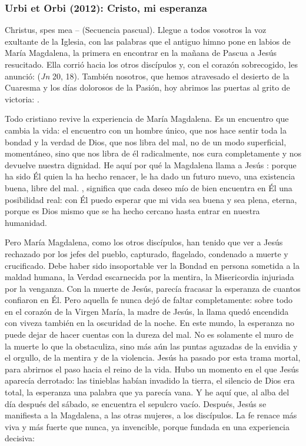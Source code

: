 \subsubsection{Urbi et Orbi (2012): Cristo, mi esperanza}


\begin{body}

 Christus, spes mea --  (Secuencia pascual). Llegue a todos vosotros la voz exultante de la Iglesia, con las palabras que el antiguo himno pone en labios de María Magdalena, la primera en encontrar en la mañana de Pascua a Jesús resucitado. Ella corrió hacia los otros discípulos y, con el corazón sobrecogido, les anunció:  (\textit{Jn} 20, 18). También nosotros, que hemos atravesado el desierto de la Cuaresma y los días dolorosos de la Pasión, hoy abrimos las puertas al grito de victoria: .

Todo cristiano revive la experiencia de María Magdalena. Es un encuentro que cambia la vida: el encuentro con un hombre único, que nos hace sentir toda la bondad y la verdad de Dios, que nos libra del mal, no de un modo superficial, momentáneo, sino que nos libra de él radicalmente, nos cura completamente y nos devuelve nuestra dignidad. He aquí por qué la Magdalena llama a Jesús : porque ha sido Él quien la ha hecho renacer, le ha dado un futuro nuevo, una existencia buena, libre del mal. , significa que cada deseo mío de bien encuentra en Él una posibilidad real: con Él puedo esperar que mi vida sea buena y sea plena, eterna, porque es Dios mismo que se ha hecho cercano hasta entrar en nuestra humanidad. 

Pero María Magdalena, como los otros discípulos, han tenido que ver a Jesús rechazado por los jefes del pueblo, capturado, flagelado, condenado a muerte y crucificado. Debe haber sido insoportable ver la Bondad en persona sometida a la maldad humana, la Verdad escarnecida por la mentira, la Misericordia injuriada por la venganza. Con la muerte de Jesús, parecía fracasar la esperanza de cuantos confiaron en Él. Pero aquella fe nunca dejó de faltar completamente: sobre todo en el corazón de la Virgen María, la madre de Jesús, la llama quedó encendida con viveza también en la oscuridad de la noche. En este mundo, la esperanza no puede dejar de hacer cuentas con la dureza del mal. No es solamente el muro de la muerte lo que la obstaculiza, sino más aún las puntas aguzadas de la envidia y el orgullo, de la mentira y de la violencia. Jesús ha pasado por esta trama mortal, para abrirnos el paso hacia el reino de la vida. Hubo un momento en el que Jesús aparecía derrotado: las tinieblas habían invadido la tierra, el silencio de Dios era total, la esperanza una palabra que ya parecía vana. Y he aquí que, al alba del día después del sábado, se encuentra el sepulcro vacío. Después, Jesús se manifiesta a la Magdalena, a las otras mujeres, a los discípulos. La fe renace más viva y más fuerte que nunca, ya invencible, porque fundada en una experiencia decisiva: 


\end{body}
